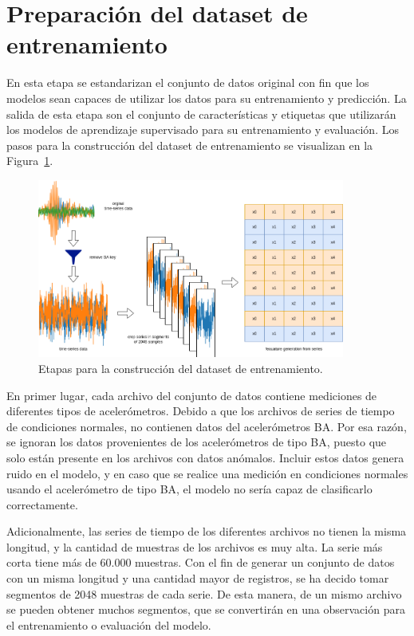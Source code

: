 \documentclass[11pt,a4paper,spanish]{book}
\numberwithin{equation}{chapter}
\numberwithin{figure}{chapter}
\begin{document}
\section{Preparación del dataset de entrenamiento}

En esta etapa se estandarizan el conjunto de datos original con fin que los modelos sean capaces de utilizar los datos para su entrenamiento y predicción. La salida de esta etapa son el conjunto de características y etiquetas que utilizarán los modelos de aprendizaje supervisado para su entrenamiento y evaluación. Los pasos para la construcción del dataset de entrenamiento se visualizan en la Figura~\ref{fig:figGenerationDataset}.


\begin{figure}[h]
    \centering
    \includegraphics[width=0.9\textwidth]{media/generacion-dataset.drawio.png}
    \caption{Etapas para la construcción del dataset de entrenamiento.}
    \label{fig:figGenerationDataset}
\end{figure}


En primer lugar, cada archivo del conjunto de datos contiene mediciones de diferentes tipos de acelerómetros. Debido a que los archivos de series de tiempo de condiciones normales, no contienen datos del acelerómetros BA. Por esa razón, se ignoran los datos provenientes de los acelerómetros de tipo BA, puesto que solo están presente en los archivos con datos anómalos. Incluir estos datos genera ruido en el modelo, y en caso que se realice una medición en condiciones normales usando el acelerómetro de tipo BA, el modelo no sería capaz de clasificarlo correctamente.


Adicionalmente, las series de tiempo de los diferentes archivos no tienen la misma longitud, y la cantidad de muestras de los archivos es muy alta. La serie más corta tiene más de 60.000 muestras. Con el fin de generar un conjunto de datos con un misma longitud y una cantidad mayor de registros, se ha decido tomar segmentos de 2048 muestras de cada serie.  De esta manera, de un mismo archivo se pueden obtener muchos segmentos, que se convertirán en una observación para el entrenamiento o evaluación del modelo. 
\end{document}
